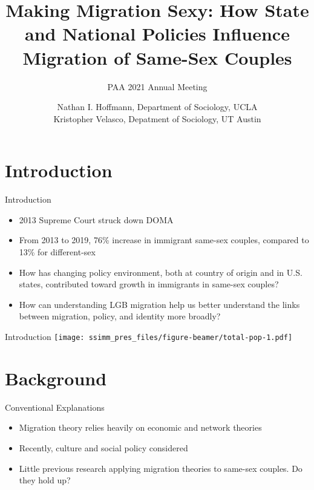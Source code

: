 \documentclass[
  ignorenonframetext,
]{beamer}
\title{Making Migration Sexy: How State and National Policies Influence
Migration of Same-Sex Couples}
\subtitle{PAA 2021 Annual Meeting}
\author{Nathan I. Hoffmann, Department of Sociology, UCLA\\
Kristopher Velasco, Depatment of Sociology, UT Austin}
\date{}
\providecommand{\tightlist}{%
  \setlength{\itemsep}{0pt}\setlength{\parskip}{0pt}}
\begin{document}
\frame{\titlepage}

\hypertarget{introduction}{%
\section{Introduction}\label{introduction}}

\begin{frame}{Introduction}
\protect\hypertarget{introduction-1}{}
\begin{itemize}
\tightlist
\item
  2013 Supreme Court struck down DOMA
\item
  From 2013 to 2019, 76\% increase in immigrant same-sex couples,
  compared to 13\% for different-sex
\item
  How has changing policy environment, both at country of origin and in
  U.S. states, contributed toward growth in immigrants in same-sex
  couples?
\item
  How can understanding LGB migration help us better understand the
  links between migration, policy, and identity more broadly?
\end{itemize}
\end{frame}

\begin{frame}{Introduction}
\protect\hypertarget{introduction-2}{}
\texttt{[image: ssimm\_pres\_files/figure-beamer/total-pop-1.pdf]}
\end{frame}

\hypertarget{background}{%
\section{Background}\label{background}}

\begin{frame}{Conventional Explanations}
\protect\hypertarget{conventional-explanations}{}
\begin{itemize}
\tightlist
\item
  Migration theory relies heavily on economic and network theories
\item
  Recently, culture and social policy considered
\item
  Little previous research applying migration theories to same-sex
  couples. Do they hold up?
\end{itemize}
\end{frame}
\end{document}
